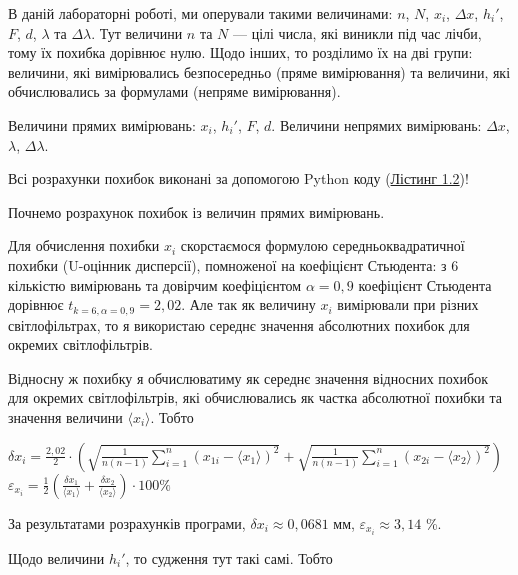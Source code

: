 \documentclass[12pt,a4paper]{article}
\begin{document}
    \setlength{\parindent}{1em}

    В даній лабораторні роботі, ми оперували такими величинами: $n$, $N$, $x_i$, $\Delta x$, $h_i'$, $F$, $d$, $\lambda$ та $\Delta \lambda$.
    Тут величини $n$ та $N$ --- цілі числа, які виникли під час лічби, тому їх похибка дорівнює нулю.
    Щодо інших, то розділимо їх на дві групи: величини, які вимірювались безпосередньо (пряме вимірювання) та величини, які обчислювались за формулами (непряме вимірювання).

    Величини прямих вимірювань: $x_i$, $h_i'$, $F$, $d$.
    Величини непрямих вимірювань: $\Delta x$, $\lambda$, $\Delta \lambda$.

    Всі розрахунки похибок виконані за допомогою Python коду (\hyperlink{listing2}{Лістинг 1.2})!

    Почнемо розрахунок похибок із величин прямих вимірювань.

    Для обчислення похибки $x_i$ скорстаємося формулою середньоквадратичної похибки (U-оцінник дисперсії), помноженої на коефіцієнт Стьюдента: з 6 кількістю вимірювань та довірчим коефіцієнтом $\alpha = 0,9$
    коефіцієнт Стьюдента дорівнює $t_{k=6, \alpha = 0,9} = 2,02$. Але так як величину $x_i$ вимірювали при різних світлофільтрах, то я використаю середнє значення абсолютних похибок для окремих світлофільтрів.

    Відносну ж похибку я обчислюватиму як середнє значення відносних похибок для окремих світлофільтрів, які обчислювались як частка абсолютної похибки та значення величини $\langle x_i \rangle$. Тобто

    \begin{center}

        $\displaystyle \delta x_i = \frac{2,02}{2} \cdot \left( \sqrt{\frac{1}{n(n-1)} \sum_{i=1}^n \left( x_{1i} - \langle x_1 \rangle \right)^2 } +
        \sqrt{\frac{1}{n(n-1)} \sum_{i=1}^n \left( x_{2i} - \langle x_2 \rangle \right)^2} \right)$ \\

        $\displaystyle \varepsilon_{x_i} = \frac{1}{2} \left( \frac{\delta x_1}{\langle x_1 \rangle} + \frac{\delta x_2}{\langle x_2 \rangle} \right) \cdot 100\%$

    \end{center}

    За результатами розрахунків програми, $\delta x_i \approx 0,0681$ мм, $\varepsilon_{x_i} \approx 3,14$ \%.

    Щодо величини $h_i'$, то судження тут такі самі. Тобто
\end{document}
